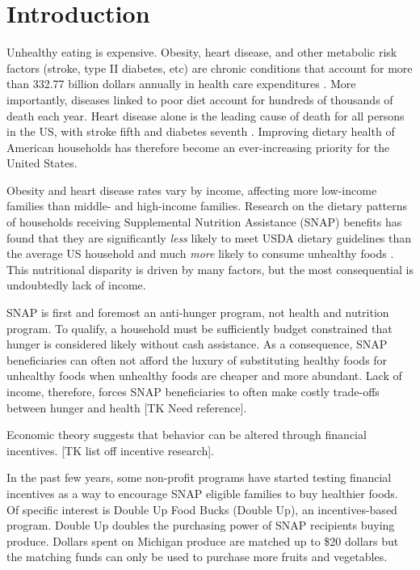 \documentclass[12pt,letterpaperpaper,]{book}
\begin{document}
\section{Introduction}\label{introduction}

Unhealthy eating is expensive. Obesity, heart disease, and other
metabolic risk factors (stroke, type II diabetes, etc) are chronic
conditions that account for more than 332.77 billion dollars annually in
health care expenditures \citep{chatterjee_checkup_2014}. More
importantly, diseases linked to poor diet account for hundreds of
thousands of death each year. Heart disease alone is the leading cause
of death for all persons in the US, with stroke fifth and diabetes
seventh \citep{national_center_for_health_statistics_health_2015}.
Improving dietary health of American households has therefore become an
ever-increasing priority for the United States.

Obesity and heart disease rates vary by income, affecting more
low-income families than middle- and high-income families. Research on
the dietary patterns of households receiving Supplemental Nutrition
Assistance (SNAP) benefits has found that they are significantly
\emph{less} likely to meet USDA dietary guidelines than the average US
household and much \emph{more} likely to consume unhealthy foods
\citep{andreyeva_dietary_2015, nguyen_supplemental_2015, wolfson_fruit_2015}.
This nutritional disparity is driven by many factors, but the most
consequential is undoubtedly lack of income.

SNAP is first and foremost an anti-hunger program, not health and
nutrition program. To qualify, a household must be sufficiently budget
constrained that hunger is considered likely without cash assistance. As
a consequence, SNAP beneficiaries can often not afford the luxury of
substituting healthy foods for unhealthy foods when unhealthy foods are
cheaper and more abundant. Lack of income, therefore, forces SNAP
beneficiaries to often make costly trade-offs between hunger and health
{[}TK Need reference{]}.

Economic theory suggests that behavior can be altered through financial
incentives. {[}TK list off incentive research{]}.

In the past few years, some non-profit programs have started testing
financial incentives as a way to encourage SNAP eligible families to buy
healthier foods. Of specific interest is Double Up Food Bucks (Double
Up), an incentives-based program. Double Up doubles the purchasing power
of SNAP recipients buying produce. Dollars spent on Michigan produce are
matched up to \$20 dollars but the matching funds can only be used to
purchase more fruits and vegetables.
\end{document}

